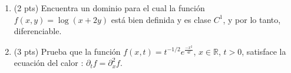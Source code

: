 \documentclass[12pt]{article}
\begin{document}
\bigskip

            
\bigskip
\bigskip
\bigskip


\begin{enumerate}

  
\item (2 pts) Encuentra un dominio para el cual la funci\'on
  $f(x,y)=\log(x+2y)$ est\'a bien definida y
  es clase $C^1$, y por lo tanto, diferenciable.


  
\vspace{4cm}  


\item (3 pts) Prueba que la funci\'on
  $f(x,t)=t^{-1/2}e^{\frac{-x^2}{4t}}$, $x\in \mathbb{R}$, $t>0$,
  satisface la ecuaci\'on del calor : $\partial_t f= \partial_x^2f$.


\end{enumerate}


  
\end{document}
